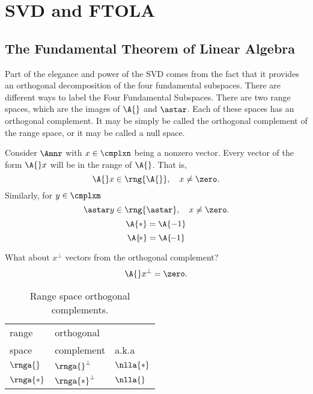 	\chapter{SVD and FTOLA}

\section[The Fundamental Theorem]{The Fundamental Theorem of Linear Algebra}
Part of the elegance and power of the SVD comes from the fact that it provides an orthogonal decomposition of the four fundamental subspaces. There are different ways to label the Four Fundamental Subspaces. There are two range spaces, which are the images of $\A{}$ and $\astar$. Each of these spaces has an orthogonal complement. It may be simply be called the orthogonal complement of the range space, or it may be called a null space.

Consider $\Amnr$ with $x\in\cmplxn$ being a nonzero vector. Every vector of the form $\A{}x$ will be in the range of $\A{}$. That is,
\begin{equation}
  \A{}x \in \rng{\A{}}, \quad x\ne\zero.
\end{equation}
Similarly, for $y\in\cmplxm$
\begin{equation}
  \astar y \in \rng{\astar}, \quad x\ne\zero.
\end{equation}
\begin{equation}
  \A{*}=\A{-1}
\end{equation}
\begin{equation}
  \A{\!*}=\A{\!-1}
\end{equation}


What about $x^{\perp}$ vectors from the orthogonal complement?
\begin{equation}
  \A{}x^{\perp} = \zero.
\end{equation}

\begin{table}[htdp]
\begin{center}
\begin{tabular}{lll}
  range  & orthogonal \\
  space & complement & a.k.a \\\hline
  $\rnga{}$  & $\rnga{}^{\perp}$  & $\nlla{*}$ \\
  $\rnga{*}$ & $\rnga{*}^{\perp}$ & $\nlla{}$ \\
\end{tabular}
\end{center}
\label{tab:appB:orhcomp}
\caption[Range space orthogonal complements]{Range space orthogonal complements.}
\end{table}%


